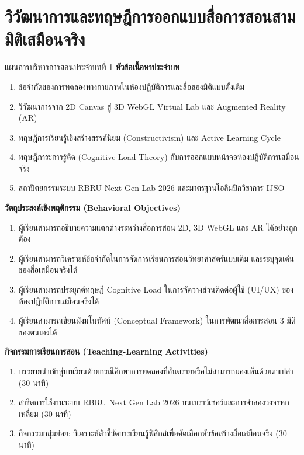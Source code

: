 \chapter{วิวัฒนาการและทฤษฎีการออกแบบสื่อการสอนสามมิติเสมือนจริง}
\label{chap:ch01}

\begin{teachingplan}{แผนการบริหารการสอนประจำบทที่ 1}
\noindent\textbf{หัวข้อเนื้อหาประจำบท}
\begin{enumerate}[leftmargin=1.5em, itemsep=2pt]
    \item ข้อจำกัดของการทดลองทางกายภาพในห้องปฏิบัติการและสื่อสองมิติแบบดั้งเดิม
    \item วิวัฒนาการจาก 2D Canvas สู่ 3D WebGL Virtual Lab และ Augmented Reality (AR)
    \item ทฤษฎีการเรียนรู้เชิงสร้างสรรค์นิยม (Constructivism) และ Active Learning Cycle
    \item ทฤษฎีภาระการรู้คิด (Cognitive Load Theory) กับการออกแบบหน้าจอห้องปฏิบัติการเสมือนจริง
    \item สถาปัตยกรรมระบบ RBRU Next Gen Lab 2026 และมาตรฐานโอลิมปิกวิชาการ IJSO
\end{enumerate}

\noindent\textbf{วัตถุประสงค์เชิงพฤติกรรม (Behavioral Objectives)}
\begin{enumerate}[leftmargin=1.5em, itemsep=2pt]
    \item ผู้เรียนสามารถอธิบายความแตกต่างระหว่างสื่อการสอน 2D, 3D WebGL และ AR ได้อย่างถูกต้อง
    \item ผู้เรียนสามารถวิเคราะห์ข้อจำกัดในการจัดการเรียนการสอนวิทยาศาสตร์แบบเดิม และระบุจุดเด่นของสื่อเสมือนจริงได้
    \item ผู้เรียนสามารถประยุกต์ทฤษฎี Cognitive Load ในการจัดวางส่วนติดต่อผู้ใช้ (UI/UX) ของห้องปฏิบัติการเสมือนจริงได้
    \item ผู้เรียนสามารถเขียนผังมโนทัศน์ (Conceptual Framework) ในการพัฒนาสื่อการสอน 3 มิติของตนเองได้
\end{enumerate}

\noindent\textbf{กิจกรรมการเรียนการสอน (Teaching-Learning Activities)}
\begin{enumerate}[leftmargin=1.5em, itemsep=2pt]
    \item บรรยายนำเข้าสู่บทเรียนด้วยกรณีศึกษาการทดลองที่อันตรายหรือไม่สามารถมองเห็นด้วยตาเปล่า (30 นาที)
    \item สาธิตการใช้งานระบบ RBRU Next Gen Lab 2026 บนเบราว์เซอร์และการจำลองวงจรหกเหลี่ยม (30 นาที)
    \item กิจกรรมกลุ่มย่อย: วิเคราะห์ตัวชี้วัดการเรียนรู้ฟิสิกส์เพื่อคัดเลือกหัวข้อสร้างสื่อเสมือนจริง (30 นาที)
\end{enumerate}


\end{teachingplan}
